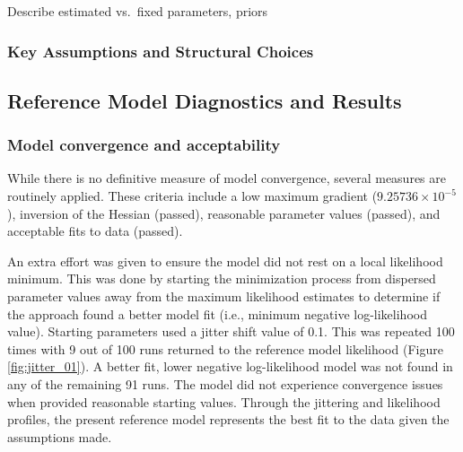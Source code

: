 \documentclass[11pt,
  english,
  a4paper,
]{article}
\begin{document}
\leavevmode\tagmcend\tagstructend


Describe estimated vs.~fixed parameters, priors

\leavevmode\tagmcend\tagstructend\par


\hypertarget{key-assumptions-and-structural-choices}{%
\subsubsection{Key Assumptions and Structural Choices}\label{key-assumptions-and-structural-choices}}

\leavevmode\tagmcend\tagstructend


\hypertarget{reference-model-diagnostics-and-results}{%
\subsection{Reference Model Diagnostics and Results}\label{reference-model-diagnostics-and-results}}

\leavevmode\tagmcend\tagstructend


\hypertarget{model-convergence-and-acceptability}{%
\subsubsection{Model convergence and acceptability}\label{model-convergence-and-acceptability}}

\leavevmode\tagmcend\tagstructend


While there is no definitive measure of model convergence, several measures are routinely applied. These criteria include a low maximum gradient (\ensuremath{9.25736\times 10^{-5}}), inversion of the Hessian (passed), reasonable parameter values (passed), and acceptable fits to data (passed).

\leavevmode\tagmcend\tagstructend\par


An extra effort was given to ensure the model did not rest on a local likelihood minimum. This was done by starting the minimization process from dispersed parameter values away from the maximum likelihood estimates to determine if the approach found a better model fit (i.e., minimum negative log-likelihood value). Starting parameters used a jitter shift value of 0.1. This was repeated 100 times with 9 out of 100 runs returned to the reference model likelihood (Figure \ref{fig:jitter_01}). A better fit, lower negative log-likelihood model was not found in any of the remaining 91 runs. The model did not experience convergence issues when provided reasonable starting values. Through the jittering and likelihood profiles, the present reference model represents the best fit to the data given the assumptions made.
\end{document}
